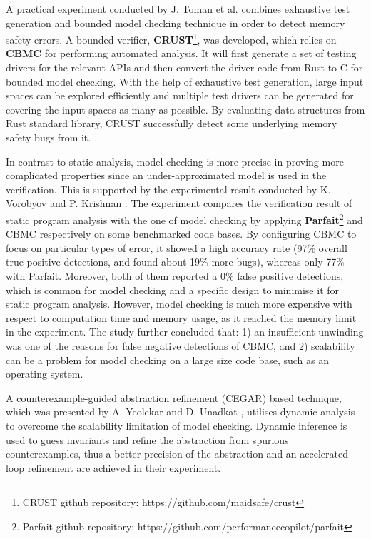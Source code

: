 A practical experiment conducted by J. Toman et al. \cite{7371997} combines exhaustive test generation and bounded model checking technique in order to detect memory safety errors. A bounded verifier, \textbf{CRUST}\footnote{CRUST github repository: https://github.com/maidsafe/crust}, was developed, which relies on \textbf{CBMC} for performing automated analysis. It will first generate a set of testing drivers for the relevant APIs and then convert the driver code from Rust to C for bounded model checking. With the help of exhaustive test generation, large input spaces can be explored efficiently and multiple test drivers can be generated for covering the input spaces as many as possible. By evaluating data structures from Rust standard library, CRUST successfully detect some underlying memory safety bugs from it.

In contrast to static analysis, model checking is more precise in proving more complicated properties since an under-approximated model is used in the verification. This is supported by the experimental result conducted by K. Vorobyov and P. Krishnan \cite{vorobyov2010comparing}. The experiment compares the verification result of static program analysis with the one of model checking by applying \textbf{Parfait}\footnote{Parfait github repository: https://github.com/performancecopilot/parfait} and CBMC respectively on some benchmarked code bases. By configuring CBMC to focus on particular types of error, it showed a high accuracy rate (97\% overall true positive detections, and found about 19\% more bugs), whereas only 77\% with Parfait. Moreover, both of them reported a 0\% false positive detections, which is common for model checking and a specific design to minimise it for static program analysis. However, model checking is much more expensive with respect to computation time and memory usage, as it reached the memory limit in the experiment. The study further concluded that: 1) an insufficient unwinding was one of the reasons for false negative detections of CBMC, and 2) scalability can be a problem for model checking on a large size code base, such as an operating system.

A counterexample-guided abstraction refinement (CEGAR) based technique, which was presented by A. Yeolekar and D. Unadkat \cite{Yeolekar2013}, utilises dynamic analysis to overcome the scalability limitation of model checking. Dynamic inference is used to guess invariants and refine the abstraction from spurious counterexamples, thus a better precision of the abstraction and an accelerated loop refinement are achieved in their experiment. 


